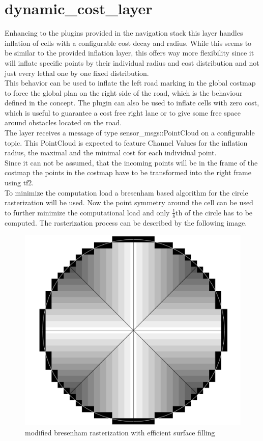 \section{dynamic\_cost\_layer}
Enhancing to the plugins provided in the navigation stack this layer handles inflation of cells with a configurable cost decay and radius. While this seems to be similar to the provided inflation layer, this offers way more flexibility since it will inflate specific points by their individual radius and cost distribution and not just every lethal one by one fixed distribution.\\

This behavior can be used to inflate the left road marking in the global costmap to force the global plan on the right side of the road, which is the behaviour defined in the concept. The plugin can also be used to inflate cells with zero cost, which is useful to guarantee a cost free right lane or to give some free space around obstacles located on the road.\\

The layer receives a message of type sensor\_msgs::PointCloud on a configurable topic. This PointCloud is expected to feature Channel Values for the inflation radius, the maximal and the minimal cost for each individual point.\\

Since it can not be assumed, that the incoming points will be in the frame of the costmap the points in the costmap have to be transformed into the right frame using tf2.\\

To minimize the computation load a bresenham based algorithm for the circle rasterization will be used\cite{ComputerGraphics}. Now the point symmetry around the cell can be used to further minimize the computational load and only $\frac{1}{8}$th of the circle has to be computed. The rasterization process can be described by the following image.\\

\begin{figure}
	\centering
	\includegraphics[width=.5\textwidth]{Pictures/rasterization}
	\caption{modified bresenham rasterization with efficient surface filling}
	\label{rasterization}
\end{figure}


